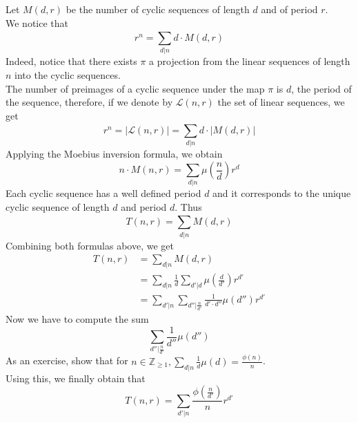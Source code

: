 \documentclass[../main.tex]{subfiles}
\begin{document}
Let $M( d,r) $ be the number of cyclic sequences of length $d$ and of period $r$.\\
We notice that
\[ 
	r^{n} = \sum_{d|n}^{ } d \cdot M( d,r) 
\]
Indeed, notice that there exists $\pi$ a projection from the linear sequences of length $n$ into the cyclic sequences.\\
The number of preimages of a cyclic sequence under the map $\pi$ is $d$, the period of the sequence, therefore, if we denote by $ \mathcal{L} ( n,r)   $ the set of linear sequences, we get
\[ 
	r^{n}=| \mathcal{L} ( n,r) | = \sum_{d|n}^{ } d \cdot | M( d,r) |
\]
Applying the Moebius inversion formula, we obtain
\[ 
	n \cdot M( n,r)  = \sum_{d|n}^{ } \mu ( \frac{n}{d}) r^{d}
\]
Each cyclic sequence has a well defined period $d$ and it corresponds to the unique cyclic sequence of length $d$ and period $d$.
Thus
\[ 
	T( n,r)  = \sum_{d|n}^{ } M( d,r) 
\]
Combining both formulas above, we get
\begin{align*}
	T( n,r) &= \sum_{d|n}^{ } M( d,r) \\
		&= \sum_{d|n}^{ } \frac{1}{d} \sum_{d'|d}^{ } \mu( \frac{d}{d'}) r^{d'}\\
		&= \sum_{d'|n}^{ } \sum_{d''| \frac{n}{d'}}^{ } \frac{1}{d'\cdot d''} \mu( d'') r^{d'}
\end{align*}
Now we have to compute the sum 
\[ 
	\sum_{d''| \frac{n}{d'}}^{ } \frac{1}{d''} \mu( d'') 
\]
As an exercise, show that for $n \in \mathbb{Z}_{ \geq 1}, \sum_{d|n}^{ } \frac{1}{d} \mu( d)  = \frac{\phi( n) }{n} $.\\
Using this, we finally obtain that
\[ 
	T( n,r) = \sum_{d'|n}^{ } \frac{\phi( \frac{n}{d'}) }{n} r^{d'}
\]
\end{document}
